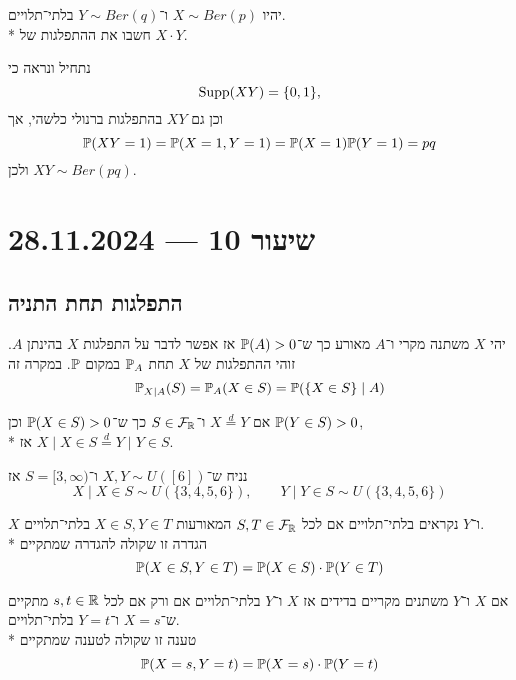 \begin{exercise}
	יהיו $X \sim Ber(p)$ ו־$Y \sim Ber(q)$ בלתי־תלויים. \\*
	חשבו את ההתפלגות של $X \cdot Y$.
\end{exercise}
\begin{solution}
	נתחיל ונראה כי
	\[
		\operatorname{Supp}(X Y) = \{0, 1\},
	\]
	וכן גם $XY$ בהתפלגות ברנולי כלשהי, אך
	\[
		\mathbb{P}(XY = 1)
		= \mathbb{P}(X = 1, Y = 1)
		= \mathbb{P}(X = 1) \mathbb{P}(Y = 1)
		= pq
	\]
	ולכן $XY \sim Ber(pq)$.
\end{solution}

\section{שיעור 10 --- 28.11.2024}
\subsection{התפלגות תחת התניה}
\begin{definition}
	יהי $X$ משתנה מקרי ו־$A$ מאורע כך ש־$\mathbb{P}(A) > 0$ אז אפשר לדבר על התפלגות $X$ בהינתן $A$.
	זוהי ההתפלגות של $X$ תחת $\mathbb{P}_A$ במקום $\mathbb{P}$.
	במקרה זה
	\[
		\mathbb{P}_{X \mid A}(S) = \mathbb{P}_A(X \in S) = \mathbb{P}(\{X \in S\} \mid A)
	\]
\end{definition}
\begin{proposition}
	אם $X \overset{d}{=} Y$ ו־$S \in \mathcal{F}_{\mathbb{R}}$ כך ש־$\mathbb{P}(X \in S) > 0$ וכן $\mathbb{P}(Y \in S) > 0$, \\*
	אז $X \mid X \in S \overset{d}{=} Y \mid Y \in S$.
\end{proposition}
\begin{example}
	נניח ש־$X, Y \sim U([6])$ ו־$S = [3, \infty)$ אז
	\[
		X \mid X \in S \sim U(\{3, 4, 5, 6\}),
		\qquad
		Y \mid Y \in S \sim U(\{3, 4, 5, 6\})
	\]
\end{example}
\begin{definition}
	$X$ ו־$Y$ נקראים בלתי־תלויים אם לכל $S, T \in \mathcal{F}_{\mathbb{R}}$ המאורעות $X \in S, Y \in T$ בלתי־תלויים. \\*
	הגדרה זו שקולה להגדרה שמתקיים
	\[
		\mathbb{P}(X \in S, Y \in T) = \mathbb{P}(X \in S) \cdot \mathbb{P}(Y \in T)
	\]
\end{definition}
\begin{proposition}
	אם $X$ ו־$Y$ משתנים מקריים בדידים אז $X$ ו־$Y$ בלתי־תלויים אם ורק אם לכל $s, t \in \mathbb{R}$ מתקיים ש־$X = s$ ו־$Y = t$ בלתי־תלויים. \\*
	טענה זו שקולה לטענה שמתקיים
	\[
		\mathbb{P}(X = s, Y = t) = \mathbb{P}(X = s) \cdot \mathbb{P}(Y = t)
	\]
\end{proposition}
